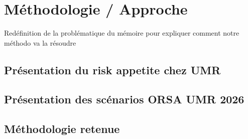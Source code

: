 \chapter{Méthodologie / Approche}
\label{chap:problematique_methodologie}

Redéfinition de la problématique du mémoire pour expliquer comment notre méthodo va la résoudre
\section{Présentation du risk appetite chez UMR}
\section{Présentation des scénarios ORSA UMR 2026}
\section{Méthodologie retenue}
